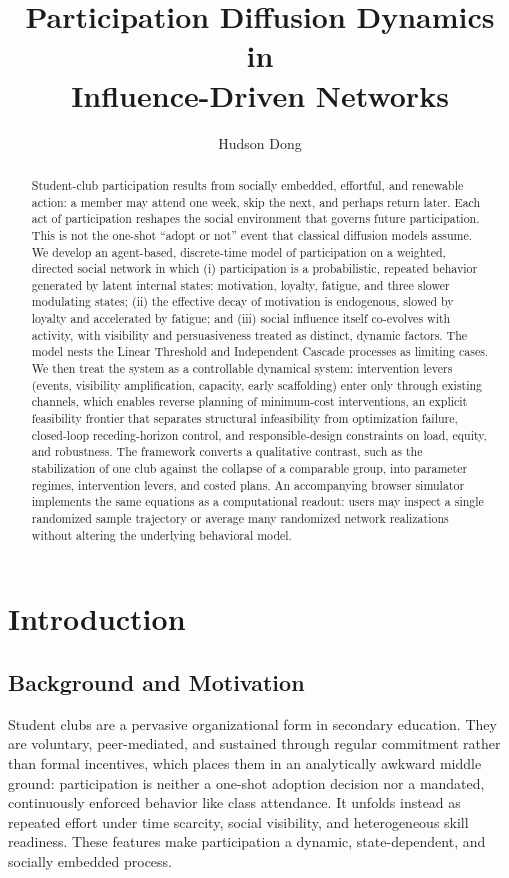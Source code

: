 \documentclass[11pt]{article}
\title{\textbf{Participation Diffusion Dynamics in\\ Influence-Driven Networks}}
\author{Hudson Dong}
\date{}
\begin{document}
\maketitle

\begin{abstract}
\noindent
Student-club participation results from socially embedded, effortful, and renewable action: a member may attend one week, skip the next, and perhaps return later. Each act of participation reshapes the social environment that governs future participation. This is not the one-shot ``adopt or not'' event that classical diffusion models assume. We develop an agent-based, discrete-time model of participation on a weighted, directed social network in which (i) participation is a probabilistic, repeated behavior generated by latent internal states: motivation, loyalty, fatigue, and three slower modulating states; (ii) the effective decay of motivation is endogenous, slowed by loyalty and accelerated by fatigue; and (iii) social influence itself co-evolves with activity, with visibility and persuasiveness treated as distinct, dynamic factors. The model nests the Linear Threshold and Independent Cascade processes as limiting cases. We then treat the system as a controllable dynamical system: intervention levers (events, visibility amplification, capacity, early scaffolding) enter only through existing channels, which enables reverse planning of minimum-cost interventions, an explicit feasibility frontier that separates structural infeasibility from optimization failure, closed-loop receding-horizon control, and responsible-design constraints on load, equity, and robustness. The framework converts a qualitative contrast, such as the stabilization of one club against the collapse of a comparable group, into parameter regimes, intervention levers, and costed plans. An accompanying browser simulator implements the same equations as a computational readout: users may inspect a single randomized sample trajectory or average many randomized network realizations without altering the underlying behavioral model.
\end{abstract}

\section{Introduction}

\subsection{Background and Motivation}
Student clubs are a pervasive organizational form in secondary education. They are voluntary, peer-mediated, and sustained through regular commitment rather than formal incentives, which places them in an analytically awkward middle ground: participation is neither a one-shot adoption decision nor a mandated, continuously enforced behavior like class attendance. It unfolds instead as repeated effort under time scarcity, social visibility, and heterogeneous skill readiness. These features make participation a dynamic, state-dependent, and socially embedded process.
\end{document}
